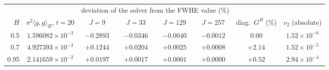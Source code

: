 \begin{tabular}{rccccccc}\toprule
 & & \multicolumn{4}{c}{deviation of the solver from the FWHE value (\%)} & & \\\cmidrule(lr){3-6}
$H$ & $\sigma^2\langle g,g\rangle_H$, $t=20$ & $J=9$ & $J=33$ & $J=129$ & $J=257$ & diag.\ $G^H$ (\%) & $v_2$ (absolute) \\\midrule
0.5 & $1.596082\times10^{-3}$ & $-0.2893$ & $-0.0346$ & $-0.0040$ & $-0.0012$ & 0.00 & $1.52\times10^{-6}$ \\
0.7 & $4.927393\times10^{-3}$ & $+0.1244$ & $+0.0204$ & $+0.0025$ & $+0.0008$ & $+2.14$ & $1.52\times10^{-5}$ \\
0.95 & $2.141659\times10^{-2}$ & $+0.0197$ & $+0.0017$ & $+0.0001$ & $+0.0000$ & $+0.52$ & $2.94\times10^{-4}$ \\
\bottomrule\end{tabular}